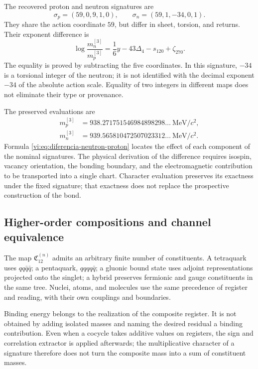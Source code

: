 The recovered proton and neutron signatures are
\[
 \sigma_p=(59,0,9,1,0),\qquad
 \sigma_n=(59,1,-34,0,1).
\]
They share the action coordinate \(59\), but differ in sheet,
torsion, and returns. Their exponent difference is
\begin{equation}
 \log\frac{m_n^{[3]}}{m_p^{[3]}}
 =\frac16y-43\Delta_4-s_{120}+\zeta_{270}.
 \label{vi:eq:diferencia-neutron-proton}
\end{equation}
The equality is proved by subtracting the five coordinates. In this signature,
\(-34\) is a torsional integer of the neutron; it is not identified with the
decimal exponent \(-34\) of the absolute action scale. Equality
of two integers in different maps does not eliminate their type or provenance.

The preserved evaluations are
\begin{align*}
 m_p^{[3]}&=938.271751546984898298\ldots\ \mathrm{MeV}/c^2,\\
 m_n^{[3]}&=939.565810472507023312\ldots\ \mathrm{MeV}/c^2.
\end{align*}
Formula \eqref{vi:eq:diferencia-neutron-proton} locates the effect of
each component of the nominal signatures. The physical derivation of the
difference requires isospin, vacancy orientation, the bonding
boundary, and the electromagnetic contribution to be transported into a single chart.
Character evaluation preserves its exactness under the fixed signature;
that exactness does not replace the prospective construction of the bond.

\subsection{Higher-order compositions and channel equivalence}
\label{vi:subsec:compuestos-superiores}

The map \(\mathfrak C_{12}^{(n)}\) admits an arbitrary finite
number of constituents. A tetraquark uses \(qq\bar q\bar q\);
a pentaquark, \(qqqq\bar q\); a gluonic bound state uses
adjoint representations projected onto the singlet; a hybrid preserves
fermionic and gauge constituents in the same tree. Nuclei,
atoms, and molecules use the same precedence of register and reading,
with their own couplings and boundaries.

Binding energy belongs to the realization of the composite register.
It is not obtained by adding isolated masses and naming the desired
residual a binding contribution. Even when a cocycle takes additive values on
registers, the sign and correlation extractor is applied afterwards;
the multiplicative character of a signature therefore does not turn the composite
mass into a sum of constituent masses.

